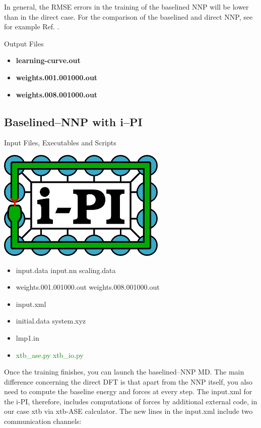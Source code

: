 \documentclass[12pt]{article}
\begin{document}
In general, the RMSE errors in the training of the baselined NNP will be lower than in the direct case. For the comparison of the baselined and direct NNP, see for example Ref. .
\begin{mybox3}{Output Files}
\begin{itemize}
    \item \textbf{learning-curve.out}
    \item \textbf{weights.001.001000.out}
    \item \textbf{weights.008.001000.out}
\end{itemize}
\end{mybox3}
%
\subsection{Baselined--NNP with i--PI}
\begin{mybox2}{{Input Files, Executables and Scripts}}
\begin{minipage}[c]{0.5\linewidth}
\includegraphics[scale=0.35]{latex_files/ipi-logo-alpha.png}
\end{minipage}
\begin{minipage}[c]{0.5\linewidth}
\begin{itemize}
    \item input.data input.nn scaling.data
    \item weights.001.001000.out weights.008.001000.out
    \item input.xml
    \item initial.data system.xyz
    \item lmp1.in
    \item \textcolor{green}{xtb\_ase.py xtb\_io.py}
\end{itemize}
\end{minipage}
\end{mybox2}

Once the training finishes, you can launch the baselined--NNP MD. The main difference concerning the direct DFT is that apart from the NNP itself, you also need to compute the baseline energy and forces at every step. The input.xml for the i-PI, therefore, includes computations of forces by additional external code, in our case xtb via xtb-ASE calculator. The new lines in the input.xml include two communication channels:
\end{document}
